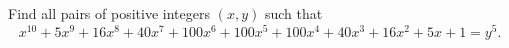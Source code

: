 Find all pairs of positive integers $(x,y)$ such that
\[x^{10}+5x^9+16x^8+40x^7+100x^6+100x^5+100x^4+40x^3+16x^2+5x+1=y^5 .\]
